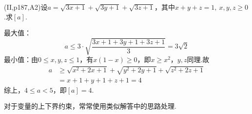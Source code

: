 \documentclass[cn,hazy,black,10pt,normal]{elegantnote}
\begin{document}
\begin{problem}
	(II,p187,A2)设$a=\sqrt{3x+1}+\sqrt{3y+1}+\sqrt{3z+1}$，其中$x+y+z=1,~x,y,z\geq 0$.求$[a]$.
\end{problem}
\begin{solution}
	最大值：$$a \leq 3 \cdot \sqrt{\dfrac{3x+1+3y+1+3z+1}{3}} = 3 \sqrt{2}$$
	最小值：由$0 \leq x,y,z \leq 1$，有$x(1-x) \geq 0$，即$x \geq x^2$，$y,z$同理.故
	\begin{align*}
		a &\geq \sqrt{x^2+2x+1} + \sqrt{y^2+2y+1} + \sqrt{z^2+2z+1} \\
		&= x+1+y+1+z+1 = 4
	\end{align*}
	综上，$4 \leq a <5$，即$[a]=4$.
\end{solution}
\begin{remark}
	对于变量的上下界约束，常常使用类似解答中的思路处理.
\end{remark}
\end{document}
